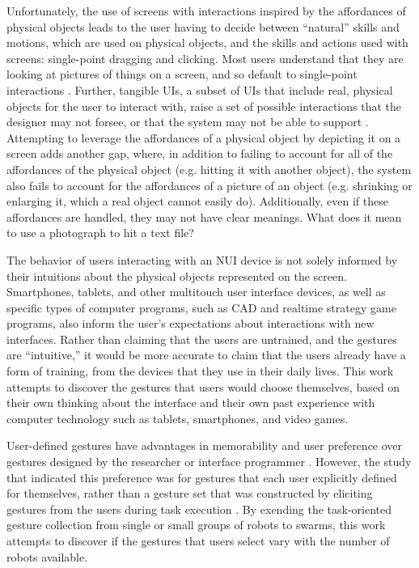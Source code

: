 Unfortunately, the use of screens with interactions inspired by the affordances of physical objects leads to the user having to decide between ``natural'' skills and motions, which are used on physical objects, and the skills and actions used with screens: single-point dragging and clicking. 
Most users understand that they are looking at pictures of things on a screen, and so default to single-point interactions \citep{vanacken2008ghosts}.
Further, tangible UIs, a subset of UIs that include real, physical objects for the user to interact with, raise a set of possible interactions that the designer may not forsee, or that the system may not be able to support \citep{hornecker2012beyond}.
Attempting to leverage the affordances of a physical object by depicting it on a screen adds another gap, where, in addition to failing to account for all of the affordances of the physical object (e.g. hitting it with another object), the system also fails to account for the affordances of a picture of an object (e.g. shrinking or enlarging it, which a real object cannot easily do). 
Additionally, even if these affordances are handled, they may not have clear meanings. 
What does it mean to use a photograph to hit a text file?

The behavior of users interacting with an NUI device is not solely informed by their intuitions about the physical objects represented on the screen. 
Smartphones, tablets, and other multitouch user interface devices, as well as specific types of computer programs, such as CAD and realtime strategy game programs, also inform the user's expectations about interactions with new interfaces. 
Rather than claiming that the users are untrained, and the gestures are ``intuitive,'' it would be more accurate to claim that the users already have a form of training, from the devices that they use in their daily lives. 
This work attempts to discover the gestures that users would choose themselves, based on their own thinking about the interface and their own past experience with computer technology such as tablets, smartphones, and video games. 

User-defined gestures have advantages in memorability and user preference over gestures designed by the researcher or interface programmer \citep{nacenta2013memorability}. 
However, the study that indicated this preference was for gestures that each user explicitly defined for themselves, rather than a gesture set that was constructed by eliciting gestures from the users during task execution \citep{Micire:2009:ANG:1731903.1731912}. 
By exending the task-oriented gesture collection from single or small groups of robots to swarms, this work attempts to discover if the gestures that users select vary with the number of robots available.

